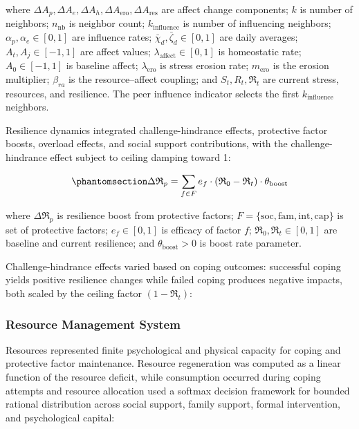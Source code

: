 \documentclass[
  letterpaper,
  DIV=11,
  numbers=noendperiod]{scrartcl}
\begin{document}
where
\(\Delta A_p, \Delta A_e, \Delta A_h, \Delta A_{\mathrm{ero}}, \Delta A_{\mathrm{res}}\)
are affect change components; \(k\) is number of neighbors;
\(n_{\mathrm{nb}}\) is neighbor count; \(k_{\text{influence}}\) is
number of influencing neighbors; \(\alpha_p, \alpha_e \in [0,1]\) are
influence rates; \(\bar{\chi}_d, \bar{\zeta}_d \in [0,1]\) are daily
averages; \(A_t, A_j \in [-1,1]\) are affect values;
\(\lambda_{\text{affect}} \in [0,1]\) is homeostatic rate;
\(A_{\text{0}} \in [-1,1]\) is baseline affect;
\(\lambda_{\mathrm{ero}}\) is stress erosion rate; \(m_{\mathrm{ero}}\)
is the erosion multiplier; \(\beta_{ra}\) is the resource--affect
coupling; and \(S_t, R_t, \mathfrak{R}_t\) are current stress,
resources, and resilience. The peer influence indicator selects the
first \(k_{\text{influence}}\) neighbors.

Resilience dynamics integrated challenge-hindrance effects, protective
factor boosts, overload effects, and social support contributions, with
the challenge-hindrance effect subject to ceiling damping toward 1:

\begin{equation}\phantomsection\label{eq-resilience-boosts}{
\Delta \mathfrak{R}_p = \sum_{f \in F} e_f \cdot (\mathfrak{R}_{\text{0}} - \mathfrak{R}_t) \cdot \theta_{\text{boost}}
}\end{equation}

where \(\Delta \mathfrak{R}_p\) is resilience boost from protective
factors;
\(F = \{\mathrm{soc}, \mathrm{fam}, \mathrm{int}, \mathrm{cap}\}\) is
set of protective factors; \(e_f \in [0,1]\) is efficacy of factor
\(f\); \(\mathfrak{R}_{\text{0}}, \mathfrak{R}_t \in [0,1]\) are
baseline and current resilience; and \(\theta_{\text{boost}} > 0\) is
boost rate parameter.

Challenge-hindrance effects varied based on coping outcomes: successful
coping yields positive resilience changes while failed coping produces
negative impacts, both scaled by the ceiling factor
\((1 - \mathfrak{R}_t)\):

\subsubsection{Resource Management
System}\label{resource-management-system}

Resources represented finite psychological and physical capacity for
coping and protective factor maintenance. Resource regeneration was
computed as a linear function of the resource deficit, while consumption
occurred during coping attempts and resource allocation used a softmax
decision framework for bounded rational distribution across social
support, family support, formal intervention, and psychological capital:
\end{document}
